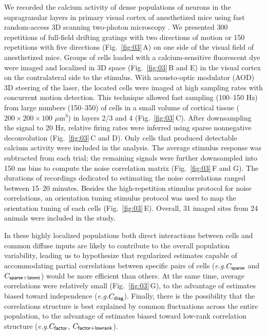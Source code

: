 \documentclass[10pt]{article}
\begin{document}
We recorded the calcium activity of dense populations of neurons in the supragranular layers in primary visual cortex of anesthetized mice using fast random-access 3D scanning two-photon microscopy \cite{Reddy:2005,Katona:2012,Cotton:2013}. We presented 300 repetitions of full-field drifting gratings with two directions of motion or 150 repetitions with five directions (Fig.~\ref{fig:03}\,A) on one side of the visual field of anesthetized mice. Groups of cells loaded with a calcium-sensitive fluorescent dye were imaged and localized in 3D space (Fig.~\ref{fig:03}\,B and E) in the visual cortex on the contralateral side to the stimulus. With acousto-optic modulator (AOD) 3D steering of the laser, the located cells were imaged at high sampling rates with concurrent motion detection.  This technique allowed fast sampling (100--150 Hz) from large numbers (150--350) of cells in a small volume of cortical tissue ($200\times200\times100$ $\mu$m$^3$) in layers 2/3 and 4 (Fig.~\ref{fig:03}\,C). After downsampling the signal to 20 Hz, relative firing rates were inferred using sparse nonnegative deconvolution \cite{Vogelstein:2010} (Fig.~\ref{fig:03}\,C and D). Only cells that produced detectable calcium activity were included in the analysis. The average stimulus response was subtracted from each trial; the remaining signals were further downsampled into 150 ms bins to compute the noise correlation matrix (Fig.~\ref{fig:03}\,F and G). The durations of recordings dedicated to estimating the noise correlations ranged between 15--20 minutes.  Besides the high-repetition stimulus protocol for noise correlations, an orientation tuning stimulus protocol was used to map the orientation tuning of each cells (Fig.~\ref{fig:03}\,E). Overall, 31 imaged sites from 24 animals were included in the study.

In these highly localized populations both direct interactions between cells and common diffuse inputs are likely to contribute to the overall population variability, leading us to hypothesize that regularized estimates capable of accommodating partial correlations between specific pairs of cells (\emph{e.g.}\;$C_{\sf sparse}$ and $C_{\sf sparse+latent}$) would be more efficient than others. At the same time, average correlations were relatively small (Fig.~\ref{fig:03}\,G), to the advantage of estimates biased toward independence (\emph{e.g.}\;$C_{\sf diag}$). Finally, there is the possibility that the correlations structure is best explained by common fluctuations across the entire population, to the advantage of estimates biased toward low-rank correlation structure (\emph{e.g.}\;$C_{\sf factor}$, $C_{\sf factor+lowrank}$).
\end{document}
